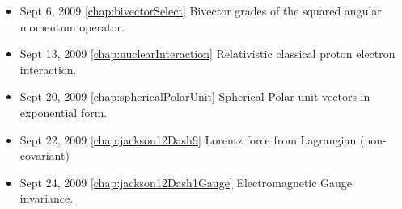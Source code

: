 \begin{itemize}
\item Sept 6, 2009 \ref{chap:bivectorSelect} Bivector grades of the squared angular momentum operator.

\item Sept 13, 2009 \ref{chap:nuclearInteraction} Relativistic classical proton electron interaction.

\item Sept 20, 2009 \ref{chap:sphericalPolarUnit} Spherical Polar unit vectors in exponential form.

\item Sept 22, 2009 \ref{chap:jackson12Dash9} Lorentz force from Lagrangian (non-covariant)

\item Sept 24, 2009 \ref{chap:jackson12Dash1Gauge} Electromagnetic Gauge invariance.

\end{itemize}
